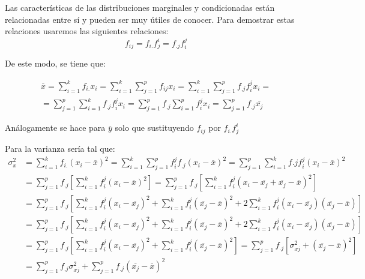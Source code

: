 \documentclass[10pt, a4paper]{article}
\theoremstyle{theorem-style}
\theoremstyle{definition-style}
\theoremstyle{remark-style}
\theoremstyle{example-style}
\theoremstyle{definition-style}
\theoremstyle{remark-style}
\begin{document}
	Las características de las distribuciones marginales y condicionadas están
	relacionadas entre sí y pueden ser muy útiles de conocer. Para demostrar estas
	relaciones usaremos las siguientes relaciones: $$f_{ij} = f_{i.} f_j^i =
	f_{.j} f_i^j $$

De este modo, se tiene que:

	\begin{align*} \overline{x} = \sum_{i=1}^k f_{i.} x_i = \sum_{i=1}^{k}
	\sum_{j=1}^{p} f_{ij} x_i =  \sum_{i=1}^{k} \sum_{j=1}^{p} f_{.j} f_i^j x_i =  \\ =
	\sum_{j=1}^p \sum_{i=1}^k f_{.j}f_i^j x_i = \sum_{j=1}^{p} f_{.j}
	\sum_{i=1}^{p} f_i^j  x_i = \sum_{j=1}^p f_{.j} \overline{x_j} \end{align*}

	Análogamente se hace para $\overline{y}$ solo que sustituyendo $f_{ij}$ por
	$f_{i.} f_j^i$

\pagebreak

	Para la varianza sería tal que:
\begin{equation*}
\begin{split}
\sigma_x^2 &=
	\sum_{i=1}^k f_{i.} (x_i - \overline{x})^2 =
	\sum_{i=1}^k \sum_{j=1}^p f_i^j f_{.j} {(x_i -\overline{x})}^2 =
	\sum_{j=1}^p \sum_{i=1}^k f{.j}f_i^j {(x_i - \overline{x})}^2 \\
 	&=\sum_{j=1}^p f_{.j} \left[
												\sum_{i=1}^k f_i^j {(x_i - \overline{x})}^2
											\right] = \sum_{j=1}^p f_{.j} \left[
											  \sum_{i=1}^k f_i^j
													{(x_i - \overline{x_j} +
													\overline{x_j} - \overline{x})}^2
											\right] \\
	&= \sum_{j=1}^p f_{.j} \left[
										 	 	  \sum_{i=1}^k f_i^j {(x_i - \overline{x_j})}^2 +
												  \sum_{i=1}^k f_i^j {(\overline{x_j}-\overline{x})}^2 +
											   2\sum_{i=1}^k f_i^j
											  	{(x_i - \overline{x_j})}
													 {(\overline{x_j} -\overline{x})}
												\right] \\
&= \sum_{j=1}^p f_{.j} \left[
												\sum_{i=1}^k f_i^j {(x_i - \overline{x_j})}^2 +
												\sum_{i=1}^k f_i^j {(\overline{x_j}-\overline{x})}^2
												+ {2\sum_{i=1}^k f_i^j
														{(x_i - \overline{x_j})}
														{(\overline{x_j}-\overline{x})}}
											 \right] \\
&= \sum_{j=1}^p f_{.j} \left[
												\sum_{i=1}^k f_i^j{(x_i - \overline{x_j})}^2 +
												\sum_{i=1}^k f_i^j {(\overline{x_j}-\overline{x})}^2
												\right] =
\sum_{j=1}^p f_{.j} \left[
												\sigma_{xj}^2 +
												{(\overline{x_j}-\overline{x})}^2
										\right] \\
&= \sum_{j=1}^p f_{.j} \sigma_{xj}^2 +
	\sum_{j=1}^p f_{.j} {(\overline{x_j} - \overline{x})}^2
\end{split}
\end{equation*}
\end{document}
